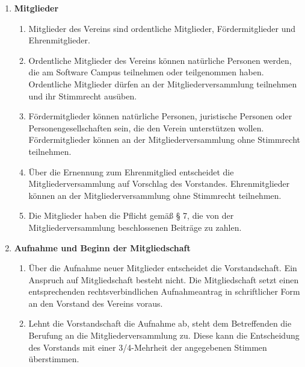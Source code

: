 \documentclass{article}
\begin{document}
\begin{enumerate}[§ 1.]
\item \textsf{\textbf{Mitglieder}}
	\begin{enumerate}[1.]
	\item Mitglieder des Vereins sind ordentliche Mitglieder, Fördermitglieder und
Ehrenmitglieder.
	\item Ordentliche Mitglieder des Vereins können natürliche Personen werden, die am
Software Campus teilnehmen oder teilgenommen haben.
Ordentliche Mitglieder
dürfen an der Mitgliederversammlung teilnehmen und ihr Stimmrecht ausüben.
	\item Fördermitglieder können natürliche Personen, juristische Personen oder
Personengesellschaften sein, die den Verein unterstützen wollen. Fördermitglieder
können an der Mitgliederversammlung ohne Stimmrecht teilnehmen.
	\item Über die Ernennung zum Ehrenmitglied entscheidet die Mitgliederversammlung auf Vorschlag des Vorstandes.
Ehrenmitglieder können an der Mitgliederversammlung ohne Stimmrecht teilnehmen.
	\item Die Mitglieder haben die Pflicht gemäß § 7, die von der Mitgliederversammlung
beschlossenen Beiträge zu zahlen.
	\end{enumerate}

\item \textsf{\textbf{Aufnahme und Beginn der Mitgliedschaft}}
	\begin{enumerate}[1.]
	\item Über die Aufnahme neuer Mitglieder entscheidet die Vorstandschaft. Ein Anspruch
auf Mitgliedschaft besteht nicht. Die Mitgliedschaft setzt einen entsprechenden
rechtsverbindlichen Aufnahmeantrag in schriftlicher Form an den Vorstand des
Vereins voraus.
	\item Lehnt die Vorstandschaft die Aufnahme ab, steht dem Betreffenden die Berufung
an die Mitgliederversammlung zu. Diese kann die Entscheidung des Vorstands mit
einer 3/4-Mehrheit der angegebenen Stimmen überstimmen.
	\end{enumerate}


\end{enumerate}
\end{document}

